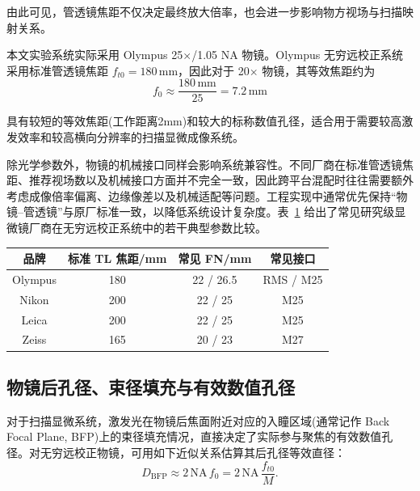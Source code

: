 由此可见，管透镜焦距不仅决定最终放大倍率，也会进一步影响物方视场与扫描映射关系。

本文实验系统实际采用 Olympus 25$\times$/1.05 NA 物镜。Olympus 无穷远校正系统采用标准管透镜焦距 $f_{t0}=180\,\mathrm{mm}$，因此对于 20$\times$ 物镜，其等效焦距约为
\begin{equation}
f_0 \approx \frac{180\,\mathrm{mm}}{25}=7.2\,\mathrm{mm}
\label{eq:f0_olympus20x}
\end{equation}

具有较短的等效焦距(工作距离2mm)和较大的标称数值孔径，适合用于需要较高激发效率和较高横向分辨率的扫描显微成像系统。

除光学参数外，物镜的机械接口同样会影响系统兼容性。不同厂商在标准管透镜焦距、推荐视场数以及机械接口方面并不完全一致，因此跨平台混配时往往需要额外考虑成像倍率偏离、边缘像差以及机械适配等问题。工程实现中通常优先保持``物镜--管透镜''与原厂标准一致，以降低系统设计复杂度。表~\ref{tab:objective_brand_compare} 给出了常见研究级显微镜厂商在无穷远校正系统中的若干典型参数比较。

\begin{table}[htbp]
\centering
{}
\label{tab:objective_brand_compare}
\setlength{\tabcolsep}{4pt}
\begin{tabular}{|c|c|c|c|}
\hline
品牌 & 标准 TL 焦距/mm & 常见 FN/mm & 常见接口 \\ \hline
Olympus & 180 & 22 / 26.5 & RMS / M25 \\ \hline
Nikon   & 200 & 22 / 25   & M25 \\ \hline
Leica   & 200 & 22 / 25   & M25 \\ \hline
Zeiss   & 165 & 20 / 23   & M27 \\ \hline
\end{tabular}
\end{table}




\subsection{物镜后孔径、束径填充与有效数值孔径}\label{2.4.2}

对于扫描显微系统，激发光在物镜后焦面附近对应的入瞳区域(通常记作 Back Focal Plane, BFP)上的束径填充情况，直接决定了实际参与聚焦的有效数值孔径。对无穷远校正物镜，可用如下近似关系估算其后孔径等效直径：
\begin{equation}
  D_{\mathrm{BFP}}\approx 2\,\mathrm{NA}\,f_0
  =2\,\mathrm{NA}\,\frac{f_{t0}}{M}.
  \label{eq:Dbfp}
\end{equation}

